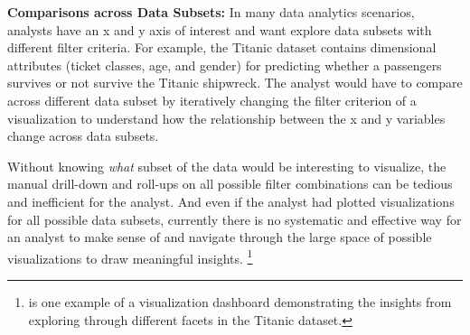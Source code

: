 
\textbf{Comparisons across Data Subsets:} In many data analytics scenarios, analysts have an x and y axis of interest and want explore data subsets with different filter criteria. For example, the Titanic dataset contains dimensional attributes (ticket classes, age, and gender) for predicting whether a passengers survives or not survive the Titanic shipwreck. The analyst would have to compare across different data subset by iteratively changing the filter criterion of a visualization to understand how the relationship between the x and y variables change across data subsets.
\par Without knowing \textit{what} subset of the data would be interesting to visualize, the manual drill-down and roll-ups on all possible filter combinations can be tedious and inefficient for the analyst. And even if the analyst had plotted visualizations for all possible data subsets, currently there is no systematic and effective way for an analyst to make sense of and navigate through the large space of possible visualizations to draw meaningful insights. \footnote{\cite{anand} is one example of a visualization dashboard demonstrating the insights from exploring through different facets in the Titanic dataset.}

